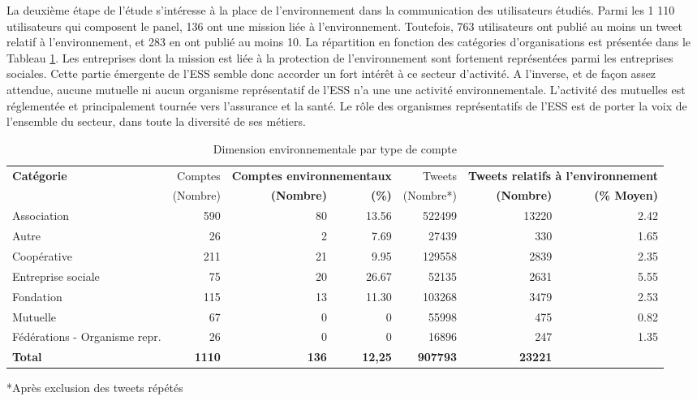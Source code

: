     La deuxième étape de l’étude s’intéresse à la place de l’environnement dans la communication des utilisateurs étudiés. Parmi les 1 110 utilisateurs qui composent le panel, 136 ont une mission liée à l’environnement. Toutefois, 763 utilisateurs ont publié au moins un tweet relatif à l’environnement, et 283 en ont publié au moins 10. La répartition en fonction des catégories d’organisations est présentée dans le Tableau \ref{table:15catenvir}. Les entreprises dont la mission est liée à la protection de l’environnement sont fortement représentées parmi les entreprises sociales. Cette partie émergente de l’ESS semble donc accorder un fort intérêt à ce secteur d’activité. A l’inverse, et de façon assez attendue, aucune mutuelle ni aucun organisme représentatif de l’ESS n’a une une activité environnementale. L’activité des mutuelles est réglementée et principalement tournée vers l’assurance et la santé. Le rôle des organismes représentatifs de l’ESS est de porter la voix de l’ensemble du secteur, dans toute la diversité de ses métiers. \\

    \begin{table}
    \caption{Dimension environnementale par type de compte }
    \label{table:15catenvir}
    \footnotesize

        \begin{tabularx}{\linewidth}{|X|r|r|r|r|r|r|}
        \hline
        \multirow{2}{*}{\textbf{Catégorie}} &	Comptes&	\multicolumn{2}{|X|}{\textbf{Comptes environnementaux}}	&
        Tweets&
        \multicolumn{2}{|X|}{\textbf{Tweets relatifs à l’environnement}} \\ \cline{2-7}
        &(Nombre)&\textbf{(Nombre)}&	\textbf{(\%)}
        &(Nombre*)&\textbf{(Nombre)}	&\textbf{(\% Moyen)} \\ \hline

        Association	&590&	80&	13.56&	522499&	13220&2.42 \\ \hline
        Autre	&26&	2&	7.69&	27439 &330	&1.65 \\ \hline
        Coopérative	&211&	21	&9.95&	129558& 2839&	2.35 \\ \hline
        Entreprise sociale	&75&	20&	26.67&	52135&2631&	5.55 \\ \hline
        Fondation	&115&	13&	11.30&	103268 & 3479&	2.53 \\ \hline
        Mutuelle	&67&	0&	0&	55998&475	&0.82 \\ \hline
        Fédérations - Organisme repr. & 26 &0 &0 &16896&247&1.35 \\ \hline
        \textbf{Total} &	\textbf{1110} &	\textbf{136} &	\textbf{12,25} &	\textbf{907793} &	\textbf{23221}& \\ \hline

        \end{tabularx}
        *Après exclusion des tweets répétés
    \end{table}




